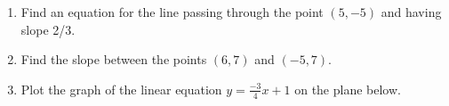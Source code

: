 \documentclass{article}
\begin{document}
\ActivityTitle[class={College Algebra}, number={1}, name={Lines and Circles}]

\begin{enumerate}
\item Find an equation for the line passing through the point $(5, -5)$ and having slope 2/3. \vspace{5cm}

\item Find the slope between the points $(6, 7)$ and $(-5, 7)$. \vspace{5cm}

\item Plot the graph of the linear equation $y = \frac{-3}{4} x + 1$ on the plane below.\begin{center}
\CartesianPlane[h=7,w=7,axes=yes]
\end{center}

  
\end{enumerate}
\end{document}
